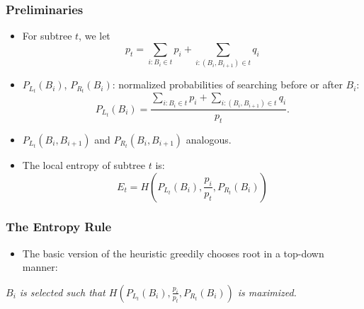 \documentclass{beamer}
\theoremstyle{plain}
\begin{document}
\begin{frame} \frametitle{Preliminaries}

\begin{itemize}

\item For subtree $t$, we let 
\begin{equation}
p_t=\sum_{i : B_i \in t} p_i + \sum_{i : (B_i, B_{i+1}) \in t} q_i
\end{equation}
\item $P_{L_t}(B_i)$, $P_{R_t}(B_i)$: normalized probabilities of searching before or after $B_i$:
\begin{equation}
P_{L_t}(B_i) = \frac{\sum_{i : B_i \in t} p_i + \sum_{i : (B_i, B_{i+1}) \in t} q_i}{p_t}.
\end{equation}
\item $P_{L_t}(B_i,B_{i+1})$ and $P_{R_t}(B_i,B_{i+1})$ analogous. \\
\item The local entropy of subtree $t$ is:
\begin{equation}
E_t=H(P_{L_t}(B_i), \frac{p_i}{p_t}, P_{R_t}(B_i))
\end{equation} 

\end{itemize}
\end{frame}


\begin{frame} \frametitle{The Entropy Rule}\label{The Entropy Rule}

\begin{itemize}
\item The basic version of the heuristic greedily chooses root in a top-down manner:
\end{itemize}
\begin{center}
\textit{$B_i$ is selected such that $H(P_{L_t}(B_i), \frac{p_i}{p_t}, P_{R_t}(B_i))$ is maximized.}
\end{center}

\end{frame}
\end{document}
